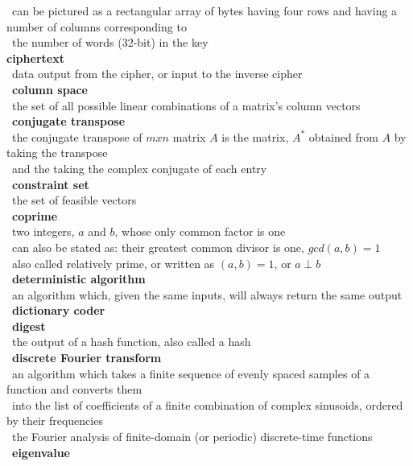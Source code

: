 \documentclass[10pt,letterpaper]{scrartcl}
\newcommand{\tbul}{\textbullet}
\newcommand{\tend}{\>\textendash}
\newcommand{\tasc}{\>\>\textasteriskcentered}
\begin{document}
\begin{tabbing}
    \tasc\ can be pictured as a rectangular array of bytes having four rows and having a number of columns corresponding to\\ \>\ the number of words (32-bit) in the key \\
\tbul \textbf{ciphertext} \\
    \tend\ data output from the cipher, or input to the inverse cipher \\
\tbul\ \textbf{column space} \\
    \tend\ the set of all possible linear combinations of a matrix's column vectors \\
\tbul\ \textbf{conjugate transpose} \\
    \tend\ the conjugate transpose of $mxn$ matrix $A$ is the matrix, $A^*$ obtained from $A$ by taking the transpose \\ \>\ and the taking the complex conjugate of each entry \\
\tbul\ \textbf{constraint set} \\
    \tend\ the set of feasible vectors \\
\tbul\ \textbf{coprime} \\
    \tend\ two integers, $a$ and $b$, whose only common factor is one \\
    \tend\ can also be stated as: their greatest common divisor is one, $gcd(a,b)=1$ \\
    \tend\ also called relatively prime, or written as $(a,b)=1$, or $a\perp b$ \\
\tbul\ \textbf{deterministic algorithm} \\
    \tend\ an algorithm which, given the same inputs, will always return the same output\\
\tbul\ \textbf{dictionary coder} \\
\tbul\ \textbf{digest} \\
    \tend\ the output of a hash function, also called a hash \\
\tbul\ \textbf{discrete Fourier transform} \\
    \tend\ an algorithm which takes a finite sequence of evenly spaced samples of a function and converts them \\ \>\ into the list of coefficients of a finite combination of complex sinusoids, ordered by their frequencies \\
    \tend\ the Fourier analysis of finite-domain (or periodic) discrete-time functions \\
\tbul\ \textbf{eigenvalue} \\

\end{tabbing}
\end{document}
